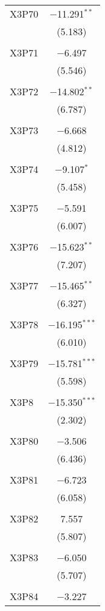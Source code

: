 \begin{table}[!htbp]
\begin{tabular}{@{\extracolsep{5pt}}lc}
 X3P70 & $-$11.291$^{**}$ \\ 
  & (5.183) \\ 
  & \\ 
 X3P71 & $-$6.497 \\ 
  & (5.546) \\ 
  & \\ 
 X3P72 & $-$14.802$^{**}$ \\ 
  & (6.787) \\ 
  & \\ 
 X3P73 & $-$6.668 \\ 
  & (4.812) \\ 
  & \\ 
 X3P74 & $-$9.107$^{*}$ \\ 
  & (5.458) \\ 
  & \\ 
 X3P75 & $-$5.591 \\ 
  & (6.007) \\ 
  & \\ 
 X3P76 & $-$15.623$^{**}$ \\ 
  & (7.207) \\ 
  & \\ 
 X3P77 & $-$15.465$^{**}$ \\ 
  & (6.327) \\ 
  & \\ 
 X3P78 & $-$16.195$^{***}$ \\ 
  & (6.010) \\ 
  & \\ 
 X3P79 & $-$15.781$^{***}$ \\ 
  & (5.598) \\ 
  & \\ 
 X3P8 & $-$15.350$^{***}$ \\ 
  & (2.302) \\ 
  & \\ 
 X3P80 & $-$3.506 \\ 
  & (6.436) \\ 
  & \\ 
 X3P81 & $-$6.723 \\ 
  & (6.058) \\ 
  & \\ 
 X3P82 & 7.557 \\ 
  & (5.807) \\ 
  & \\ 
 X3P83 & $-$6.050 \\ 
  & (5.707) \\ 
  & \\ 
 X3P84 & $-$3.227 \\ 

\end{tabular}
\end{table}
